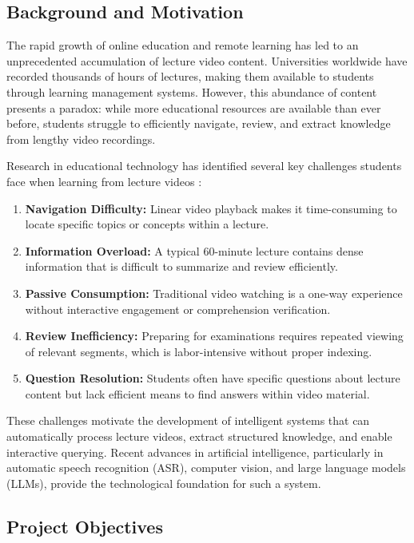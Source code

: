 \documentclass[12pt,a4paper]{article}
\begin{document}
\subsection{Background and Motivation}

The rapid growth of online education and remote learning has led to an unprecedented accumulation of lecture video content. Universities worldwide have recorded thousands of hours of lectures, making them available to students through learning management systems. However, this abundance of content presents a paradox: while more educational resources are available than ever before, students struggle to efficiently navigate, review, and extract knowledge from lengthy video recordings.

Research in educational technology has identified several key challenges students face when learning from lecture videos \cite{guo2014video}:

\begin{enumerate}
    \item \textbf{Navigation Difficulty:} Linear video playback makes it time-consuming to locate specific topics or concepts within a lecture.
    \item \textbf{Information Overload:} A typical 60-minute lecture contains dense information that is difficult to summarize and review efficiently.
    \item \textbf{Passive Consumption:} Traditional video watching is a one-way experience without interactive engagement or comprehension verification.
    \item \textbf{Review Inefficiency:} Preparing for examinations requires repeated viewing of relevant segments, which is labor-intensive without proper indexing.
    \item \textbf{Question Resolution:} Students often have specific questions about lecture content but lack efficient means to find answers within video material.
\end{enumerate}

These challenges motivate the development of intelligent systems that can automatically process lecture videos, extract structured knowledge, and enable interactive querying. Recent advances in artificial intelligence, particularly in automatic speech recognition (ASR), computer vision, and large language models (LLMs), provide the technological foundation for such a system.

\subsection{Project Objectives}
\end{document}
